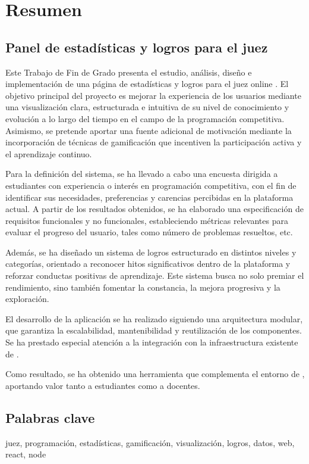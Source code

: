 \chapter{Resumen}

\section*{Panel de estadísticas y logros para el juez \aer}
\vspace{-0.5em}

Este Trabajo de Fin de Grado presenta el estudio, análisis, diseño e implementación de una página de estadísticas y logros para el juez online \aer. El objetivo principal del proyecto es mejorar la experiencia de los usuarios mediante una visualización clara, estructurada e intuitiva de su nivel de conocimiento y evolución a lo largo del tiempo en el campo de la programación competitiva. Asimismo, se pretende aportar una fuente adicional de motivación mediante la incorporación de técnicas de gamificación que incentiven la participación activa y el aprendizaje continuo.

Para la definición del sistema, se ha llevado a cabo una encuesta dirigida a estudiantes con experiencia o interés en programación competitiva, con el fin de identificar sus necesidades, preferencias y carencias percibidas en la plataforma actual. A partir de los resultados obtenidos, se ha elaborado una especificación de requisitos funcionales y no funcionales, estableciendo métricas relevantes para evaluar el progreso del usuario, tales como número de problemas resueltos, etc. 

Además, se ha diseñado un sistema de logros estructurado en distintos niveles y categorías, orientado a reconocer hitos significativos dentro de la plataforma y reforzar conductas positivas de aprendizaje. Este sistema busca no solo premiar el rendimiento, sino también fomentar la constancia, la mejora progresiva y la exploración.

El desarrollo de la aplicación se ha realizado siguiendo una arquitectura modular, que garantiza la escalabilidad, mantenibilidad y reutilización de los componentes. Se ha prestado especial atención a la integración con la infraestructura existente de \aer.

Como resultado, se ha obtenido una herramienta que complementa el entorno de \aer, aportando valor tanto a estudiantes como a docentes.

\section*{Palabras clave}
\vspace{-0.5em}

\noindent juez, programación, estadísticas, gamificación, visualización, logros, datos, web, react, node